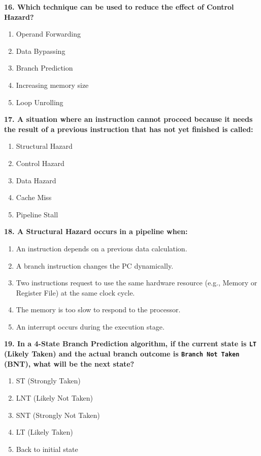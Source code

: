 \documentclass[12pt]{article}
\begin{document}
\textbf{16. Which technique can be used to reduce the effect of Control Hazard?}
\begin{enumerate}[label=\Alph*.]
    \item Operand Forwarding
    \item Data Bypassing
    \item Branch Prediction
    \item Increasing memory size
    \item Loop Unrolling
\end{enumerate}

\textbf{17. A situation where an instruction cannot proceed because it needs the result of a previous instruction that has not yet finished is called:}
\begin{enumerate}[label=\Alph*.]
    \item Structural Hazard
    \item Control Hazard
    \item Data Hazard
    \item Cache Miss
    \item Pipeline Stall
\end{enumerate}

\textbf{18. A Structural Hazard occurs in a pipeline when:}
\begin{enumerate}[label=\Alph*.]
    \item An instruction depends on a previous data calculation.
    \item A branch instruction changes the PC dynamically.
    \item Two instructions request to use the same hardware resource (e.g., Memory or Register File) at the same clock cycle.
    \item The memory is too slow to respond to the processor.
    \item An interrupt occurs during the execution stage.
\end{enumerate}

\textbf{19. In a 4-State Branch Prediction algorithm, if the current state is \texttt{LT} (Likely Taken) and the actual branch outcome is \texttt{Branch Not Taken} (BNT), what will be the next state?}
\begin{enumerate}[label=\Alph*.]
    \item ST (Strongly Taken)
    \item LNT (Likely Not Taken)
    \item SNT (Strongly Not Taken)
    \item LT (Likely Taken)
    \item Back to initial state
\end{enumerate}
\end{document}
